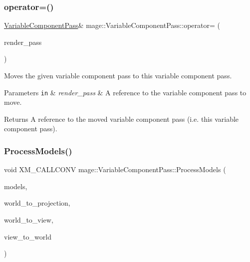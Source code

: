 \subsubsection{\texorpdfstring{operator=()}{operator=()}\hspace{0.1cm}{\footnotesize\ttfamily [2/2]}}
{\footnotesize\ttfamily \hyperlink{classmage_1_1_variable_component_pass}{Variable\+Component\+Pass}\& mage\+::\+Variable\+Component\+Pass\+::operator= (\begin{DoxyParamCaption}\item[{\hyperlink{classmage_1_1_variable_component_pass}{Variable\+Component\+Pass} \&\&}]{render\+\_\+pass }\end{DoxyParamCaption})\hspace{0.3cm}{\ttfamily [delete]}}

Moves the given variable component pass to this variable component pass.


\begin{DoxyParams}[1]{Parameters}
\mbox{\tt in}  & {\em render\+\_\+pass} & A reference to the variable component pass to move. \\
\hline
\end{DoxyParams}
\begin{DoxyReturn}{Returns}
A reference to the moved variable component pass (i.\+e. this variable component pass). 
\end{DoxyReturn}
\hypertarget{classmage_1_1_variable_component_pass_a98cbe2d4dbdcf376a36c6306f54afd24}{}\label{classmage_1_1_variable_component_pass_a98cbe2d4dbdcf376a36c6306f54afd24} 
\subsubsection{\texorpdfstring{Process\+Models()}{ProcessModels()}}
{\footnotesize\ttfamily void X\+M\+\_\+\+C\+A\+L\+L\+C\+O\+NV mage\+::\+Variable\+Component\+Pass\+::\+Process\+Models (\begin{DoxyParamCaption}\item[{const vector$<$ const \hyperlink{classmage_1_1_model_node}{Model\+Node} $\ast$ $>$ \&}]{models,  }\item[{F\+X\+M\+M\+A\+T\+R\+IX}]{world\+\_\+to\+\_\+projection,  }\item[{C\+X\+M\+M\+A\+T\+R\+IX}]{world\+\_\+to\+\_\+view,  }\item[{C\+X\+M\+M\+A\+T\+R\+IX}]{view\+\_\+to\+\_\+world }\end{DoxyParamCaption})\hspace{0.3cm}{\ttfamily [private]}}

